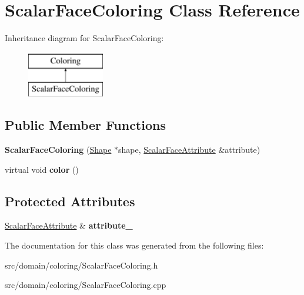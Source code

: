\hypertarget{class_scalar_face_coloring}{}\section{Scalar\+Face\+Coloring Class Reference}
\label{class_scalar_face_coloring}
Inheritance diagram for Scalar\+Face\+Coloring\+:\begin{figure}[H]
\begin{center}
\leavevmode
\includegraphics[height=2.000000cm]{class_scalar_face_coloring}
\end{center}
\end{figure}
\subsection*{Public Member Functions}
\begin{DoxyCompactItemize}
\item 
\hypertarget{class_scalar_face_coloring_a3987b4f199203be0d5e56025c19ee076}{}{\bfseries Scalar\+Face\+Coloring} (\hyperlink{class_shape}{Shape} $\ast$shape, \hyperlink{class_scalar_face_attribute}{Scalar\+Face\+Attribute} \&attribute)\label{class_scalar_face_coloring_a3987b4f199203be0d5e56025c19ee076}

\item 
\hypertarget{class_scalar_face_coloring_a5f39a3f0d8f29ae7a600b9a7ced7a1a1}{}virtual void {\bfseries color} ()\label{class_scalar_face_coloring_a5f39a3f0d8f29ae7a600b9a7ced7a1a1}

\end{DoxyCompactItemize}
\subsection*{Protected Attributes}
\begin{DoxyCompactItemize}
\item 
\hypertarget{class_scalar_face_coloring_aeca6e4c82cfbb689291e0041d735b378}{}\hyperlink{class_scalar_face_attribute}{Scalar\+Face\+Attribute} \& {\bfseries attribute\+\_\+}\label{class_scalar_face_coloring_aeca6e4c82cfbb689291e0041d735b378}

\end{DoxyCompactItemize}


The documentation for this class was generated from the following files\+:\begin{DoxyCompactItemize}
\item 
src/domain/coloring/Scalar\+Face\+Coloring.\+h\item 
src/domain/coloring/Scalar\+Face\+Coloring.\+cpp\end{DoxyCompactItemize}
